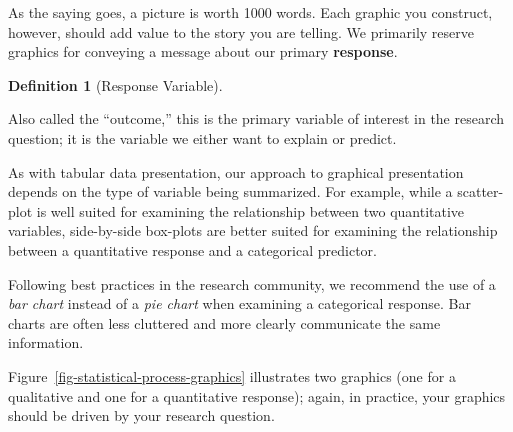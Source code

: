 \documentclass[
  letterpaper,
  DIV=11,
  numbers=noendperiod]{scrreprt}
\theoremstyle{definition}
\theoremstyle{definition}
\newtheorem{definition}{Definition}[chapter]
\theoremstyle{remark}
\begin{document}
As the saying goes, a picture is worth 1000 words. Each graphic you
construct, however, should add value to the story you are telling. We
primarily reserve graphics for conveying a message about our primary
\textbf{response}.

\begin{definition}[Response
Variable]\protect\hypertarget{def-response}{}\label{def-response}

Also called the ``outcome,'' this is the primary variable of interest in
the research question; it is the variable we either want to explain or
predict.

\end{definition}

As with tabular data presentation, our approach to graphical
presentation depends on the type of variable being summarized. For
example, while a scatter-plot is well suited for examining the
relationship between two quantitative variables, side-by-side box-plots
are better suited for examining the relationship between a quantitative
response and a categorical predictor.

\begin{tcolorbox}[enhanced jigsaw, bottomrule=.15mm, titlerule=0mm, bottomtitle=1mm, colback=white, coltitle=black, rightrule=.15mm, leftrule=.75mm, toprule=.15mm, toptitle=1mm, left=2mm, opacityback=0, colframe=quarto-callout-note-color-frame, breakable, title=\textcolor{quarto-callout-note-color}{\faInfo}\hspace{0.5em}{Note}, arc=.35mm, colbacktitle=quarto-callout-note-color!10!white, opacitybacktitle=0.6]

Following best practices in the research community, we recommend the use
of a \emph{bar chart} instead of a \emph{pie chart} when examining a
categorical response. Bar charts are often less cluttered and more
clearly communicate the same information.

\end{tcolorbox}

Figure~\ref{fig-statistical-process-graphics} illustrates two graphics
(one for a qualitative and one for a quantitative response); again, in
practice, your graphics should be driven by your research question.
\end{document}

